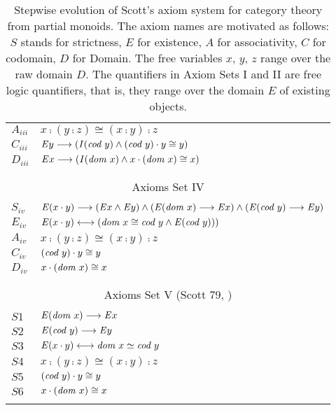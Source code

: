\begin{table}
\begin{tabular}{ll}
 $A_{iii}$ & $x\comp (y \comp z) \cong (x \comp y) \comp z$ \\
 $C_{iii}$ & $\mathit{E} y \longrightarrow (\textit{I\/}(\textit{cod \/} y) \wedge (\textit{cod \/} y) \cdot y \cong y)$ \\
 $D_{iii}$ & $\mathit{E} x \longrightarrow (\textit{I\/}(\textit{dom \/} x) \wedge x \cdot (\textit{dom \/} x) \cong x)$ \\
\\
\hline
\\
\multicolumn{2}{c}{Axioms Set IV} \\
\\
$S_{iv}$ & $\mathit{E}(x \cdot y) \longrightarrow (\mathit{E} x \wedge \mathit{E} y) \wedge (\mathit{E} (\textit{dom \/} x) \longrightarrow \mathit{E}
        x) \wedge (\mathit{E} (\textit{cod \/} y) \longrightarrow \mathit{E}
        y)$ \\
 $E_{iv}$ & $\mathit{E}(x \cdot y) \longleftrightarrow (\textit{dom \/} x \cong \textit{cod \/} y \wedge \mathit{E} (\textit{cod \/} y)))$ \\
 $A_{iv}$ & $x\comp (y \comp z) \cong (x \comp y) \comp z$ \\
 $C_{iv}$ & $(\textit{cod \/} y) \cdot y \cong y$ \\
 $D_{iv}$ & $x \cdot (\textit{dom \/} x) \cong x$  \\
\\
\hline
\\
\multicolumn{2}{c}{Axioms Set V (Scott 79, \cite{Scott79})} \\
\\
$S1$ & $\mathit{E} (\textit{dom \/} x) \longrightarrow \mathit{E} x$ \\
$S2$ & $\mathit{E} (\textit{cod \/} y) \longrightarrow \mathit{E} y$ \\
$S3$ & $\mathit{E}(x \cdot y) \longleftrightarrow \textit{dom \/} x \simeq \textit{cod \/} y$ \\
$S4$ & $x\comp (y \comp z) \cong (x \comp y) \comp z$ \\
$S5$ & $(\textit{cod \/} y) \cdot y \cong y$ \\
$S6$ & $x \cdot (\textit{dom \/} x) \cong x$  \\
\\
\hline
\end{tabular}
\caption{Stepwise evolution of Scott's \cite{Scott79} axiom
  system for category theory from partial monoids. The axiom names are
  motivated as follows: 
  $S$ stands for strictness, $E$ for existence, $A$ for associativity, $C$ for
  codomain, $D$ for Domain. The free variables $x$, $y$, $z$ range over
  the raw domain $D$. The quantifiers in Axiom Sets I and II are
  free logic quantifiers, that is, they range over the domain $E$ of
  existing objects. \label{axioms-sets-1}}
\end{table}





